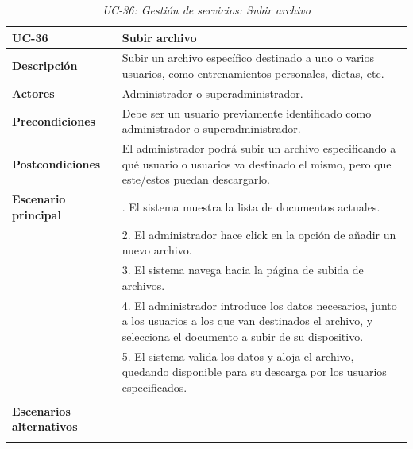 \begin{table}
  \begin{center}
    \begin{tabularx}{16.4cm}{|l|X|}
      \hline
      \textbf{UC-36} & \textbf{Subir archivo}\\
      \hline
      \textbf{Descripción} & Subir un archivo específico destinado a uno o varios usuarios, como entrenamientos personales, dietas, etc. \\
      \hline
      \textbf{Actores} & Administrador o superadministrador.\\
      \hline
      \textbf{Precondiciones} & Debe ser un usuario previamente identificado como administrador o superadministrador.\\
      \hline
      \textbf{Postcondiciones} & El administrador podrá subir un archivo especificando a qué usuario o usuarios va destinado el mismo, pero que este/estos puedan descargarlo.\\
      \hline
      \textbf{Escenario principal} & \smallskip 1. El sistema muestra la lista de documentos actuales.\\
      & 2. El administrador hace click en la opción de añadir un nuevo archivo.\\
      & 3. El sistema navega hacia la página de subida de archivos.\\
      & 4. El administrador introduce los datos necesarios, junto a los usuarios a los que van destinados el archivo, y selecciona el documento a subir de su dispositivo.\\
      & 5. El sistema valida los datos y aloja el archivo, quedando disponible para su descarga por los usuarios especificados.\\
      & \\
      \hline
      \textbf{Escenarios alternativos} & \\
      & \\
      \hline
    \end{tabularx}
    \caption{\textit{UC-36: Gestión de servicios: Subir archivo}}
    \label{tab:CU-subir-archivo}
  \end{center}
\end{table}


